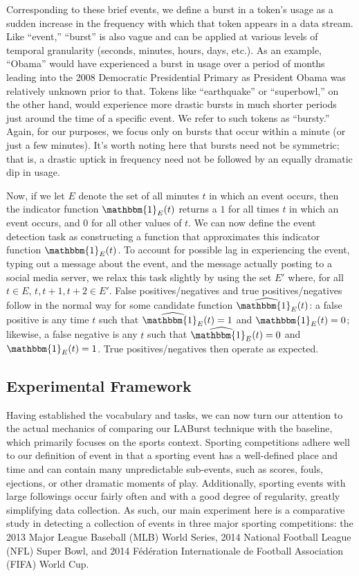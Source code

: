 \documentclass{acm_proc_article-sp}
\begin{document}
Corresponding to these brief events, we define a burst in a token's usage as a sudden increase in the frequency with which that token appears in a data stream.
Like ``event,'' ``burst'' is also vague and can be applied at various levels of temporal granularity (seconds, minutes, hours, days, etc.).
As an example, ``Obama'' would have experienced a burst in usage over a period of months leading into the 2008 Democratic Presidential Primary as President Obama was relatively unknown prior to that. 
Tokens like ``earthquake'' or ``superbowl,'' on the other hand, would experience more drastic bursts in much shorter periods just around the time of a specific event.
We refer to such tokens as ``bursty.''
Again, for our purposes, we focus only on bursts that occur within a minute (or just a few minutes). 
It's worth noting here that bursts need not be symmetric; that is, a drastic uptick in frequency need not be followed by an equally dramatic dip in usage.

Now, if we let $E$ denote the set of all minutes $t$ in which an event occurs, then the indicator function $\mathbbm{1}_E(t)$ returns a $1$ for all times $t$ in which an event occurs, and $0$ for all other values of $t$. 
We can now define the event detection task as constructing a function that approximates this indicator function $\mathbbm{1}_E(t)$.
To account for possible lag in experiencing the event, typing out a message about the event, and the message actually posting to a social media server, we relax this task slightly by using the set $E'$ where, for all $t \in E$, $t, t+1, t+2 \in E'$.
False positives/negatives and true positives/negatives follow in the normal way for some candidate function $\widehat{\mathbbm{1}_E}(t)$: a false positive is any time $t$ such that $\widehat{\mathbbm{1}_E}(t) = 1$ and ${\mathbbm{1}_E}(t) = 0$; likewise, a false negative is any $t$ such that $\widehat{\mathbbm{1}_E}(t) = 0$ and ${\mathbbm{1}_E}(t) = 1$.
True positives/negatives then operate as expected.

\subsection{Experimental Framework}

Having established the vocabulary and tasks, we can now turn our attention to the actual mechanics of comparing our LABurst technique with the baseline, which primarily focuses on the sports context.
Sporting competitions adhere well to our definition of event in that a sporting event has a well-defined place and time and can contain many unpredictable sub-events, such as scores, fouls, ejections, or other dramatic moments of play.
Additionally, sporting events with large followings occur fairly often and with a good degree of regularity, greatly simplifying data collection.
As such, our main experiment here is a comparative study in detecting a collection of events in three major sporting competitions: the 2013 Major League Baseball (MLB) World Series, 2014 National Football League (NFL) Super Bowl, and 2014 F\'{e}d\'{e}ration Internationale de Football Association (FIFA) World Cup.
\end{document}
